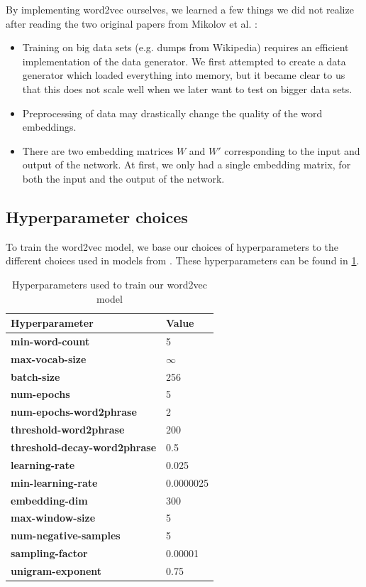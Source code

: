 By implementing word2vec ourselves, we learned a few things we did not realize after reading the two original papers from Mikolov et al. \cite{mikolov2013a, mikolov2013b}:
\begin{itemize}
    \item Training on big data sets (e.g. dumps from Wikipedia) requires an efficient implementation of the data generator. We first attempted to create a data generator which loaded everything into memory, but it became clear to us that this does not scale well when we later want to test on bigger data sets.
    \item Preprocessing of data may drastically change the quality of the word embeddings.
    \item There are two embedding matrices $W$ and $W'$ corresponding to the input and output of the network. At first, we only had a single embedding matrix, for both the input and the output of the network.
\end{itemize}

\subsection{Hyperparameter choices}
\label{sec:word2vec-hyperparameter-choices}
To train the word2vec model, we base our choices of hyperparameters to the different choices used in models from \cite{mikolov2013a, mikolov2013b}. These hyperparameters can be found in \cref{table:word2vec-hyperparameter-choices}.

\begin{table}[ht]
    \centering
    \begin{tabular}{@{}ll@{}}
    \toprule
    Hyperparameter & Value\\
    \midrule
    \trcolor \textbf{min-word-count} & 5\\
    \textbf{max-vocab-size} & $\infty$ \\
    \trcolor \textbf{batch-size} & 256\\
    \textbf{num-epochs} & 5\\
    \trcolor \textbf{num-epochs-word2phrase} & 2\\
    \textbf{threshold-word2phrase} & 200\\
    \trcolor \textbf{threshold-decay-word2phrase} & 0.5\\
    \textbf{learning-rate} & 0.025\\
    \trcolor \textbf{min-learning-rate} & 0.0000025\\
    \textbf{embedding-dim} & 300\\
    \trcolor \textbf{max-window-size} & 5\\
    \textbf{num-negative-samples} & 5\\
    \trcolor \textbf{sampling-factor} & 0.00001\\
    \textbf{unigram-exponent} & 0.75\\
    \bottomrule
    \end{tabular}
    \caption{Hyperparameters used to train our word2vec model}
    \label{table:word2vec-hyperparameter-choices}
\end{table}

